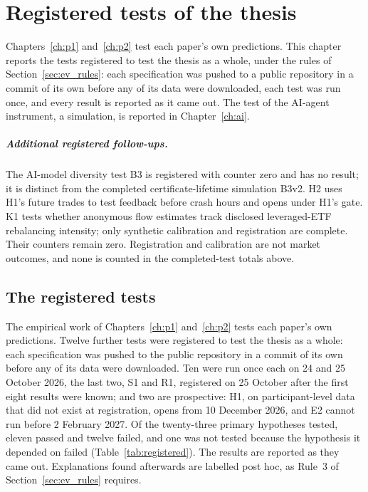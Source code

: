 \chapter{Registered tests of the thesis}\label{ch:tests}

Chapters~\ref{ch:p1} and~\ref{ch:p2} test each paper's own predictions. This chapter reports the tests registered to test the thesis as a whole, under the rules of Section~\ref{sec:ev_rules}: each specification was pushed to a public repository in a commit of its own before any of its data were downloaded, each test was run once, and every result is reported as it came out. The test of the AI-agent instrument, a simulation, is reported in Chapter~\ref{ch:ai}.

\paragraph{Additional registered follow-ups.}\label{sec:ev_pending_followups}
The AI-model diversity test B3 is registered with counter zero and has no result; it is distinct from the completed certificate-lifetime simulation B3v2. H2 uses H1's future trades to test feedback before crash hours and opens under H1's gate. K1 tests whether anonymous flow estimates track disclosed leveraged-ETF rebalancing intensity; only synthetic calibration and registration are complete. Their counters remain zero. Registration and calibration are not market outcomes, and none is counted in the completed-test totals above.

\section{The registered tests}\label{sec:evidence}



The empirical work of Chapters~\ref{ch:p1} and~\ref{ch:p2} tests each paper's own predictions. Twelve further tests were registered to test the thesis as a whole: each specification was pushed to the public repository in a commit of its own before any of its data were downloaded. Ten were run once each on 24 and 25 October 2026, the last two, S1 and R1, registered on 25 October after the first eight results were known; and two are prospective: H1, on participant-level data that did not exist at registration, opens from 10 December 2026, and E2 cannot run before 2 February 2027. Of the twenty-three primary hypotheses tested, eleven passed and twelve failed, and one was not tested because the hypothesis it depended on failed (Table~\ref{tab:registered}). The results are reported as they came out. Explanations found afterwards are labelled post hoc, as Rule~3 of Section~\ref{sec:ev_rules} requires.

